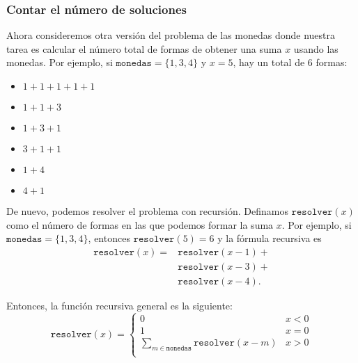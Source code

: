 \subsubsection{Contar el número de soluciones}

Ahora consideremos otra versión
del problema de las monedas donde nuestra tarea es
calcular el número total de formas
de obtener una suma $x$ usando las monedas.
Por ejemplo, si $\texttt{monedas}=\{1,3,4\}$ y
$x=5$, hay un total de 6 formas:

\begin{multicols}{2}
    \begin{itemize}
        \item $1+1+1+1+1$
        \item $1+1+3$
        \item $1+3+1$
        \item $3+1+1$
        \item $1+4$
        \item $4+1$
    \end{itemize}
\end{multicols}

De nuevo, podemos resolver el problema con recursión.
Definamos $\texttt{resolver}(x)$ como el número de formas
en las que podemos formar la suma $x$.
Por ejemplo, si $\texttt{monedas}=\{1,3,4\}$,
entonces $\texttt{resolver}(5)=6$ y la fórmula recursiva es
\begin{equation*}
    \begin{split}
        \texttt{resolver}(x) = & \texttt{resolver}(x-1) + \\
        & \texttt{resolver}(x-3) + \\
        & \texttt{resolver}(x-4)  .
    \end{split}
\end{equation*}

Entonces, la función recursiva general es la siguiente:
\begin{equation*}
    \texttt{resolver}(x) = \begin{cases}
        0                                                    & x < 0 \\
        1                                                    & x = 0 \\
        \sum_{m \in \texttt{monedas}} \texttt{resolver}(x-m) & x > 0 \\
    \end{cases}
\end{equation*}

